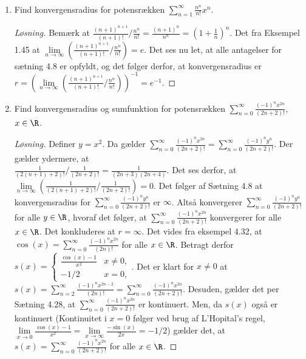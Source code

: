 \begin{opg}\hfill \\
	\begin{enumerate}
		\item Find konvergensradius for potensrækken $ \sum_{n=1}^{\infty}\frac{n^n}{n!}x^n $.
		\ifanswers
		\begin{proof}[Løsning]
			Bemærk at $ \frac{(n+1)^{n+1}}{(n+1)!}\Big/ \frac{n^n}{n!}=\frac{(n+1)^n}{n^n}=\left(1+\frac{1}{n}\right)^n $. Det fra Eksempel 1.45 at $ \lim\limits_{n\to\infty}\left(\frac{(n+1)^{n+1}}{(n+1)!}\Big/ \frac{n^n}{n!}\right)=e $.
			Det ses nu let, at alle antagelser for sætning 4.8 er opfyldt, og det følger derfor, at konvergensradius er $ r=\left(\lim\limits_{n\to\infty}\left(\frac{(n+1)^{n+1}}{(n+1)!}\Big/ \frac{n^n}{n!}\right)\right)^{-1}=e^{-1}  $.
		\end{proof}
		\fi
		\item Find konvergensradius og sumfunktion for potensrækken $ \sum_{n=0}^{\infty}\frac{(-1)^nx^{2n}}{(2n+2)!} $, $ x\in\R $. 
		\ifanswers
		\begin{proof}[Løsning]
			Definer $ y=x^2 $. Da gælder $ \sum_{n=0}^{\infty}\frac{(-1)^nx^{2n}}{(2n+2)!} =\sum_{n=0}^{\infty}\frac{(-1)^ny^{n}}{(2n+2)!}  $. Der gælder ydermere, at\\ $ \frac{1}{(2(n+1)+2)!}\Big/ \frac{1}{(2n+2)!}=\frac{1}{(2n+3)(2n+4)} $. Det ses derfor, at $ \lim\limits_{n\to\infty}\left(\frac{1}{(2(n+1)+2)!}\Big/ \frac{1}{(2n+2)!}\right)=0 $. Det følger af Sætning 4.8 at konvergensradius for $ \sum_{n=0}^{\infty}\frac{(-1)^ny^{n}}{(2n+2)!} $ er $ \infty $. Altså konvergerer $ \sum_{n=0}^{\infty}\frac{(-1)^ny^{n}}{(2n+2)!} $ for alle $ y\in \R $, hvoraf det følger, at $ \sum_{n=0}^{\infty}\frac{(-1)^nx^{2n}}{(2n+2)!} $ konvergerer for alle $ x\in \R $. Det konkluderes at $ r=\infty $. Det vides fra eksempel 4.32, at $ \cos(x)=\sum_{n=0}^{\infty}\frac{(-1)^nx^{2n}}{(2n)!} $ for alle $ x\in \R $. Betragt derfor $ s(x)=\begin{cases}
			\frac{\cos(x)-1}{x^2}& x\neq 0,\\
			-1/2& x=0,
			\end{cases} $. Det er klart for $ x\neq 0 $ at $ s(x)=\sum_{n=2}^{\infty}\frac{(-1)^nx^{2n-2}}{(2n)!}=\sum_{n=0}^{\infty}\frac{(-1)^nx^{2n}}{(2n+2)!} $. Desuden, gælder det per Sætning 4.28, at $ \sum_{n=0}^{\infty}\frac{(-1)^nx^{2n}}{(2n+2)!} $ er kontinuert. Men, da $ s(x) $ også er kontinuert (Kontinuitet i $ x=0 $ følger ved brug af L'Hopital's regel, $ \lim\limits_{x\to 0}\frac{\cos(x)-1}{x^2}=\lim\limits_{x\to\infty}\frac{-\sin(x)}{2x}=-1/2 $) gælder det, at $ s(x)=\sum_{n=0}^{\infty}\frac{(-1)^nx^{2n}}{(2n+2)!} $ for alle $ x\in\R $.

\end{proof}
\end{enumerate}
\end{opg}
